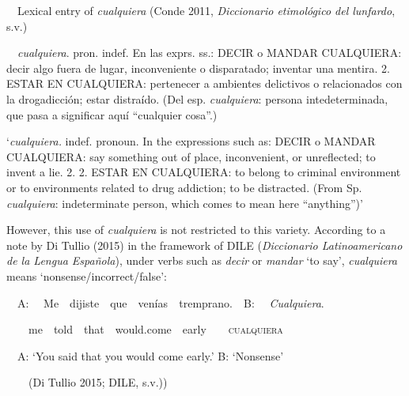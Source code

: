 \begin{styleStandard}
\ \ Lexical entry of \textit{cualquiera} (Conde 2011, \textit{Diccionario etimológico del lunfardo}, s.v.)
\end{styleStandard}

\begin{styleStandard}
\ \ \textit{cualquiera}. pron. indef. En las exprs. ss.: DECIR o MANDAR CUALQUIERA: decir algo fuera de lugar, inconveniente o disparatado; inventar una mentira. {\textbar} 2. ESTAR EN CUALQUIERA: pertenecer a ambientes delictivos o relacionados con la drogadicción; estar distraído. (Del esp. \textit{cualquiera}: persona intedeterminada, que pasa a significar aquí “cualquier cosa”.) 
\end{styleStandard}

\begin{styleStandard}
‘\textit{cualquiera.} indef. pronoun. In the expressions such as: DECIR o MANDAR CUALQUIERA: say something out of place, inconvenient, or unreflected; to invent a lie. {\textbar} 2. 2. ESTAR EN CUALQUIERA: to belong to criminal environment or to environments related to drug addiction; to be distracted. (From Sp. \textit{cualquiera}: indeterminate person, which comes to mean here “anything”)’
\end{styleStandard}

\begin{styleStandard}
However, this use of \textit{cualquiera} is not restricted to this variety. According to a note by Di Tullio (2015) in the framework of DILE (\textit{Diccionario Latinoamericano de la Lengua Española}), under verbs such as \textit{decir} or \textit{mandar} ‘to say’, \textit{cualquiera} means ‘nonsense/incorrect/false’:
\end{styleStandard}

\begin{styleStandard}
\ \ A: \ \ Me\ \ dijiste\ \ que\ \ venías\textit{\ \ }tremprano.\ \ B: \ \ \textit{Cualquiera}.
\end{styleStandard}

\begin{styleStandard}
\ \ \ \ me\ \ told\ \ that\ \ would.come\ \ early\ \  \ \ \textsc{cualquiera}
\end{styleStandard}

\begin{styleStandard}
\ \ A: ‘You said that you would come early.’ B: ‘Nonsense’
\end{styleStandard}

\begin{styleStandard}
\ \ \ \ (Di Tullio 2015; DILE, s.v.))
\end{styleStandard}

